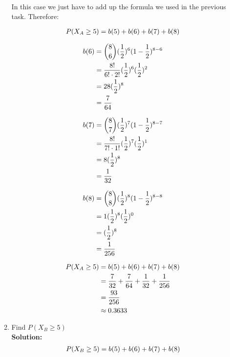 \documentclass[a4paper]{article}
\begin{document}
\begin{enumerate}
\begin{enumerate}
In this case we just have to add up the formula we used in the previous task. Therefore:

\begin{align}
	P(X_A \geq 5) = b(5) + b(6) + b(7) + b(8) \notag
\end{align}	
	


\begin{align}
	b(6) &= {8 \choose 6}(\frac{1}{2})^6(1 - \frac{1}{2})^{8 - 6}\notag\\
	&= \frac{8!}{6! \cdot 2!}(\frac{1}{2})^6(\frac{1}{2})^2\notag\\
	&= 28 (\frac{1}{2})^8\notag\\
	&= \frac{7}{64}\notag
\end{align}
	
	
\begin{align}
	b(7) &= {8 \choose 7}(\frac{1}{2})^7(1 - \frac{1}{2})^{8 - 7}\notag\\
	&= \frac{8!}{7! \cdot 1!}(\frac{1}{2})^7(\frac{1}{2})^1\notag\\
	&= 8 (\frac{1}{2})^8\notag\\
	&= \frac{1}{32}\notag
\end{align}


\begin{align}
	b(8) &= {8 \choose 8}(\frac{1}{2})^8(1 - \frac{1}{2})^{8 - 8}\notag\\
	&= 1(\frac{1}{2})^8(\frac{1}{2})^0\notag\\
	&= (\frac{1}{2})^8\notag\\
	&= \frac{1}{256}\notag
\end{align}

\begin{align}
	P(X_A \geq 5) &= b(5) + b(6) + b(7) + b(8) \notag\\
	&= \frac{7}{32} + \frac{7}{64} + \frac{1}{32} + \frac{1}{256}\notag\\
	&= \frac{93}{256}\notag\\
	&\approx 0.3633\notag
\end{align}		
	
	\item Find $P(X_B \geq 5)$\\
	\textbf{Solution:}\\

\begin{align}
	P(X_B \geq 5) = b(5) + b(6) + b(7) + b(8) \notag
\end{align}	
	

\end{enumerate}
\end{enumerate}
\end{document}
